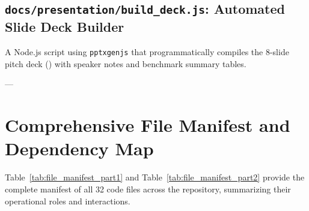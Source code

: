 \documentclass[11pt,a4paper]{article}
\begin{document}
\subsection{\texttt{docs/presentation/build\_deck.js}: Automated Slide Deck Builder}
A Node.js script using \texttt{pptxgenjs} that programmatically compiles the 8-slide pitch deck () with speaker notes and benchmark summary tables.

---

\section{Comprehensive File Manifest and Dependency Map}

Table~\ref{tab:file_manifest_part1} and Table~\ref{tab:file_manifest_part2} provide the complete manifest of all 32 code files across the repository, summarizing their operational roles and interactions.
\end{document}
